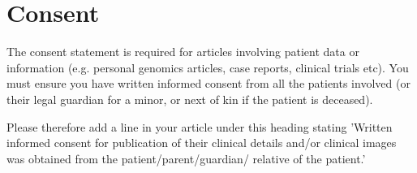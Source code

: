 \section*{Consent}
The consent statement is required for articles involving patient data or information (e.g. personal genomics articles, case reports, clinical trials etc). You must ensure you have written informed consent from all the patients involved (or their legal guardian for a minor, or next of kin if the patient is deceased).

Please therefore add a line in your article under this heading stating 'Written informed consent for publication of their clinical details and/or clinical images was obtained from the patient/parent/guardian/ relative of the patient.'
